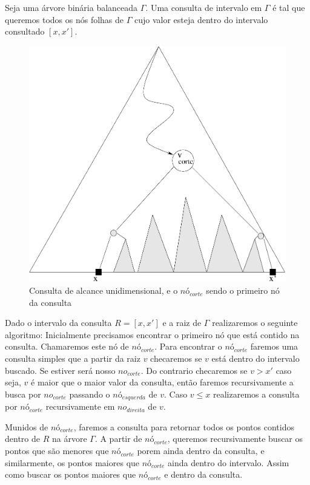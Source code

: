 Seja uma árvore binária balanceada $\Gamma$. Uma consulta de intervalo em $\Gamma$ é tal que queremos
todos os nós folhas de $\Gamma$ cujo valor esteja dentro do intervalo consultado $[x, x']$.

\begin{figure}
    
    \begin{center}
        \includegraphics[scale=0.4]{images/range_tree2.pdf}
    \end{center}
    \caption{Consulta de alcance unidimensional, e o $nó_{corte}$ sendo o primeiro nó da consulta}
\end{figure}


Dado o intervalo da consulta $R = [x , x']$ e a raiz de $\Gamma$ realizaremos o seguinte algoritmo:
Inicialmente precisamos encontrar o primeiro nó que está contido na consulta. Chamaremos este nó de $nó_{corte}$.
Para encontrar o $nó_{corte}$ faremos uma consulta simples que a partir da raiz $v$ checaremos se $v$
está dentro do intervalo buscado. Se estiver será nosso $no_{corte}$. Do contrario checaremos se $v > x'$
caso seja, $v$ é maior que o maior valor da consulta, então faremos recursivamente a busca por $no_{corte}$
passando o $nó_{esquerda}$ de $v$. Caso $v \leq x$ realizaremos a consulta por $nó_{corte}$ recursivamente
em $no_{direita}$ de $v$.


Munidos de $nó_{corte}$, faremos a consulta para retornar todos os pontos contidos dentro de $R$ na árvore
$\Gamma$.
A partir de $nó_{corte}$, queremos recursivamente buscar os pontos que são menores que $nó_{corte}$ porem
ainda dentro da consulta, e similarmente, os pontos maiores que $nó_{corte}$ ainda dentro do intervalo.
Assim como buscar os pontos maiores que $nó_{corte}$ e dentro da consulta. \cite{cg_search1}

